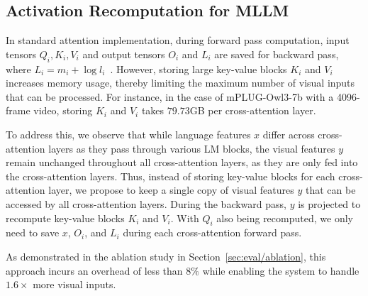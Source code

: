 \subsection{Activation Recomputation for MLLM} In standard attention implementation, during forward pass computation, input tensors $Q_i, K_i, V_i$ and output tensors $O_i$ and $L_i$ are saved for backward pass, where $L_i = m_i + \log{l_i}$~\cite{dao2023fa2}. However, storing large key-value blocks $K_i$ and $V_i$ increases memory usage, thereby limiting the maximum number of visual inputs that can be processed. For instance, in the case of mPLUG-Owl3-7b with a 4096-frame video, storing $K_i$ and $V_i$ takes $79.73$GB per cross-attention layer.

To address this, we observe that while language features $x$ differ across cross-attention layers as they pass through various LM blocks, the visual features $y$ remain unchanged throughout all cross-attention layers, as they are only fed into the cross-attention layers. Thus, instead of storing key-value blocks for each cross-attention layer, we propose to keep a single copy of visual features $y$ that can be accessed by all cross-attention layers. During the backward pass, $y$ is projected to recompute key-value blocks $K_i$ and $V_i$. With $Q_i$ also being recomputed, we only need to save $x$, $O_i$, and $L_i$ during each cross-attention forward pass.

As demonstrated in the ablation study in Section~\ref{sec:eval/ablation}, this approach incurs an overhead of less than $8\%$ while enabling the system to handle $1.6\times$ more visual inputs.



